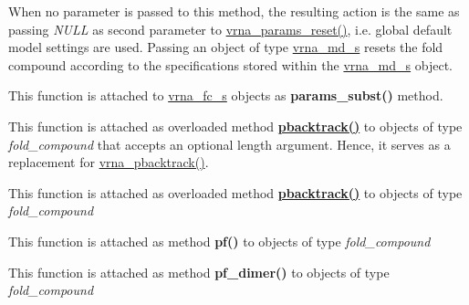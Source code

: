 \begin{DoxyRefList}
When no parameter is passed to this method, the resulting action is the same as passing {\itshape N\+U\+LL} as second parameter to \hyperlink{group__energy__parameters_gac40dc82e48a72a97cfc58b9da08a7792}{vrna\+\_\+params\+\_\+reset()}, i.\+e. global default model settings are used. Passing an object of type \hyperlink{group__model__details_structvrna__md__s}{vrna\+\_\+md\+\_\+s} resets the fold compound according to the specifications stored within the \hyperlink{group__model__details_structvrna__md__s}{vrna\+\_\+md\+\_\+s} object.  
\item[\label{wrappers__wrappers000050}%
\Hypertarget{wrappers__wrappers000050}%
Global \hyperlink{group__energy__parameters_ga5d1909208f7ea3baa98b75afaa1f62ca}{vrna\+\_\+params\+\_\+subst} (vrna\+\_\+fold\+\_\+compound\+\_\+t $\ast$vc, vrna\+\_\+param\+\_\+t $\ast$par)]This function is attached to \hyperlink{group__fold__compound_structvrna__fc__s}{vrna\+\_\+fc\+\_\+s} objects as {\bfseries params\+\_\+subst()} method.  
\item[\label{wrappers__wrappers000058}%
\Hypertarget{wrappers__wrappers000058}%
Global \hyperlink{group__subopt__stochbt_ga901fe42a33b07be083421741bf7dc610}{vrna\+\_\+pbacktrack} (vrna\+\_\+fold\+\_\+compound\+\_\+t $\ast$vc)]This function is attached as overloaded method {\bfseries \hyperlink{group__subopt__stochbt_gac03ca6db186bb3bf0a2a326d7fb3ba03}{pbacktrack()}} to objects of type {\itshape fold\+\_\+compound} that accepts an optional {\ttfamily length} argument. Hence, it serves as a replacement for \hyperlink{group__subopt__stochbt_ga901fe42a33b07be083421741bf7dc610}{vrna\+\_\+pbacktrack()}.  
\item[\label{wrappers__wrappers000057}%
\Hypertarget{wrappers__wrappers000057}%
Global \hyperlink{group__subopt__stochbt_ga347375a4da8bdff74639529847f97d4f}{vrna\+\_\+pbacktrack5} (vrna\+\_\+fold\+\_\+compound\+\_\+t $\ast$vc, int length)]This function is attached as overloaded method {\bfseries \hyperlink{group__subopt__stochbt_gac03ca6db186bb3bf0a2a326d7fb3ba03}{pbacktrack()}} to objects of type {\itshape fold\+\_\+compound}  
\item[\label{wrappers__wrappers000054}%
\Hypertarget{wrappers__wrappers000054}%
Global \hyperlink{group__pf__fold_ga29e256d688ad221b78d37f427e0e99bc}{vrna\+\_\+pf} (vrna\+\_\+fold\+\_\+compound\+\_\+t $\ast$vc, char $\ast$structure)]This function is attached as method {\bfseries pf()} to objects of type {\itshape fold\+\_\+compound}  
\item[\label{wrappers__wrappers000055}%
\Hypertarget{wrappers__wrappers000055}%
Global \hyperlink{group__pf__cofold_ga4e5c7d06c302a7c59fc0d64dc142ca63}{vrna\+\_\+pf\+\_\+dimer} (vrna\+\_\+fold\+\_\+compound\+\_\+t $\ast$vc, char $\ast$structure)]This function is attached as method {\bfseries pf\+\_\+dimer()} to objects of type {\itshape fold\+\_\+compound}  
\item[\label{wrappers__wrappers000018}%
\Hypertarget{wrappers__wrappers000018}%
Global \hyperlink{group__soft__constraints_gaf162aedac7422f2eb16ea030f47d2f4b}{vrna\+\_\+sc\+\_\+add\+\_\+bp} (vrna\+\_\+fold\+\_\+compound\+\_\+t $\ast$vc, int i, int j, F\+L\+T\+\_\+\+O\+R\+\_\+\+D\+BL energy, unsigned int options)]


\end{DoxyRefList}
